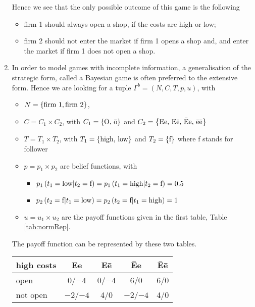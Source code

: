 \begin{enumerate}[label=\alph*.]
	      Hence we see that the only possible outcome of this game is the following
	      \begin{itemize}
	      	\item firm 1 should always open a shop, if the costs are high or low;
	      	\item firm 2 should not enter the market if firm 1 opens a shop and, and enter the market if firm 1 does not open a shop.
	      \end{itemize}

	\item In order to model games with incomplete information, a generalisation of the strategic form, called a Bayesian game is often preferred to the extensive form. Hence we are looking for a tuple $\Gamma^b = (N,C,T,p,u)$, with
	      \begin{itemize}
	      	\item $N = \left\{\text{firm 1}, \text{firm 2}\right\}$,
	      	\item $C = C_1 \times C_2$, with $C_1 = \left\{\text{O, \=o}\right\}$ and $C_2 = \left\{\text{Ee, E\=e, \=Ee, \=e\=e}\right\}$
	      	\item $T = T_1 \times T_2$, with $T_1 = \left\{\text{high, low}\right\}$ and $T_2 = \left\{\text{f}\right\}$ where f stands for follower
	      	\item $p = p_1 \times p_2$ are belief functions, with
	      	      \begin{itemize}
	      	      	\item $p_1 \left(t_1 = \text{low} | t_2 = \text{f}\right) = p_1 \left(t_1 = \text{high} | t_2 = \text{f}\right) = 0.5 $
	      	      	\item $p_2 \left( t_2 = \text{f} | t_1 = \text{low}\right) = p_2 \left( t_2 = \text{f} | t_1 = \text{high}\right) = 1 $
	      	      \end{itemize}
	      	\item $u = u_1 \times u_2$ are the payoff functions given in the first table, Table \ref{tab:normRep}.

	      \end{itemize}

				The payoff function can be represented by these two tables.

			 \begin{center}
				 \begin{tabular}{l|cccc}
              high costs & Ee & E\=e & \=Ee & \=E\=e \\
					 		\hline
              open        & 0/$-4$ & 0/$-4$ & 6/0 & 6/0 \\
              not open    & $-2$/$-4$ & 4/0 & $-2$/$-4$ & 4/0\\
				 \end{tabular}


\end{center}
\end{enumerate}
